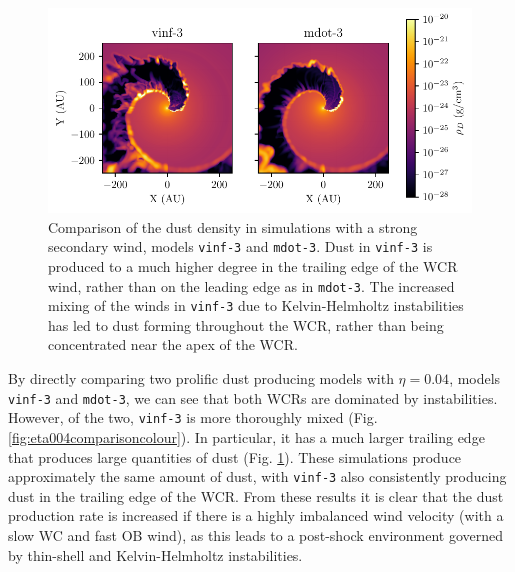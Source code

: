 \begin{figure}
  \centering
  \includegraphics{assets/results/mixed/eta-004-comparison-rhod.pdf}
  \caption[Comparison of dust density in simulations with strong secondary wind]{Comparison of the dust density in simulations with a strong secondary wind, models \texttt{vinf-3} and \texttt{mdot-3}. Dust in \texttt{vinf-3} is produced to a much higher degree in the trailing edge of the WCR wind, rather than on the leading edge as in \texttt{mdot-3}. The increased mixing of the winds in \texttt{vinf-3} due to Kelvin-Helmholtz instabilities has led to dust forming throughout the WCR, rather than being concentrated near the apex of the WCR.}
  \label{fig:eta004comparisonrhod}
\end{figure}

By directly comparing two prolific dust producing models with $\eta = 0.04$, models \texttt{vinf-3} and \texttt{mdot-3}, we can see that both WCRs are dominated by instabilities.
However, of the two, \texttt{vinf-3} is more thoroughly mixed (Fig. \ref{fig:eta004comparisoncolour}).
In particular, it has a much larger trailing edge that produces large quantities of dust (Fig. \ref{fig:eta004comparisonrhod}).
These simulations produce approximately the same amount of dust, with \texttt{vinf-3} also consistently producing dust in the trailing edge of the WCR.
From these results it is clear that the dust production rate is increased if there is a highly imbalanced wind velocity (with a slow WC and fast OB wind), as this leads to a post-shock environment governed by thin-shell and Kelvin-Helmholtz instabilities.


